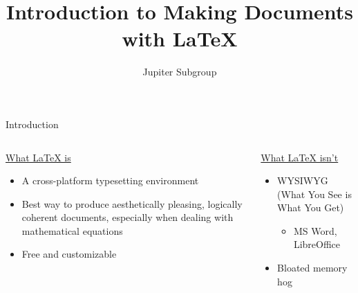 \documentclass[11pt]{beamer}
\author{Jupiter Subgroup}
\title{Introduction to Making Documents with \LaTeX}
\begin{document}
\begin{frame}
\titlepage
\end{frame}


%
%
\begin{frame}{Introduction}
\begin{columns}
	\begin{column}{6cm}
		\underline{What \LaTeX{} is}
		\begin{itemize}
			\item	A cross-platform typesetting environment
			\item 	Best way to produce aesthetically pleasing, logically coherent documents, especially when dealing with mathematical equations
			\item 	Free and customizable
		\end{itemize}
	\end{column}
		\begin{column}{5cm}
		\underline{What \LaTeX{} isn't}
		\begin{itemize}
			\item WYSIWYG (What You See is What You Get)
				\begin{itemize}
					\item MS Word, LibreOffice
				\end{itemize}
			\item Bloated memory hog
		\end{itemize}
	\end{column}
	\end{columns}
\end{frame}
\end{document}
